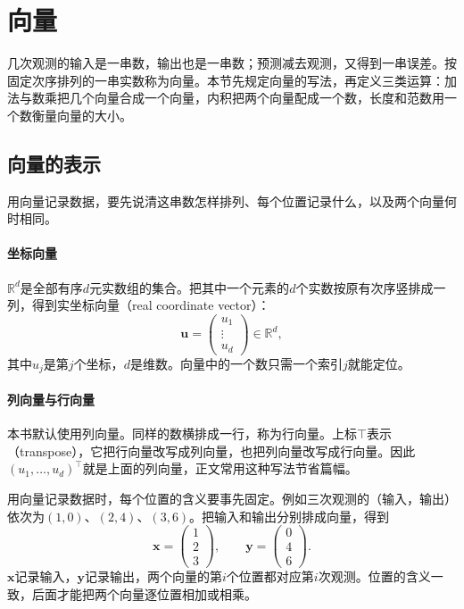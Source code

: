 
\section{向量}
\label{sec:ls-vectors}
\label{sec:ls-objects}
\label{sec:linear-algebra-objects}
\label{sec:linear-algebra-space-representations}
\label{sec:prelim-vectors-matrices}

几次观测的输入是一串数，输出也是一串数；预测减去观测，又得到一串误差。按固定次序排列的一串实数称为向量。本节先规定向量的写法，再定义三类运算：加法与数乘把几个向量合成一个向量，内积把两个向量配成一个数，长度和范数用一个数衡量向量的大小。

\subsection{向量的表示}
\label{sec:ls-vector-representation}
\label{sec:prelim-vector-records}

用向量记录数据，要先说清这串数怎样排列、每个位置记录什么，以及两个向量何时相同。

\paragraph{坐标向量}
$\mathbb R^d$是全部有序$d$元实数组的集合。把其中一个元素的$d$个实数按原有次序竖排成一列，得到实坐标向量（real coordinate vector）：
\[
 \bm u=\begin{pmatrix}u_1\\\vdots\\u_d\end{pmatrix}\in\mathbb R^d,
\]
其中$u_j$是第$j$个坐标，$d$是维数。向量中的一个数只需一个索引$j$就能定位。

\paragraph{列向量与行向量} 本书默认使用列向量。同样的数横排成一行，称为行向量。上标$\top$表示（transpose），它把行向量改写成列向量，也把列向量改写成行向量。因此$(u_1,\ldots,u_d)^\top$就是上面的列向量，正文常用这种写法节省篇幅。

用向量记录数据时，每个位置的含义要事先固定。例如三次观测的（输入，输出）依次为$(1,0)$、$(2,4)$、$(3,6)$。把输入和输出分别排成向量，得到
\[
 \bm x=\begin{pmatrix}1\\2\\3\end{pmatrix},\qquad
 \bm y=\begin{pmatrix}0\\4\\6\end{pmatrix}.
\]
$\bm x$记录输入，$\bm y$记录输出，两个向量的第$i$个位置都对应第$i$次观测。位置的含义一致，后面才能把两个向量逐位置相加或相乘。

